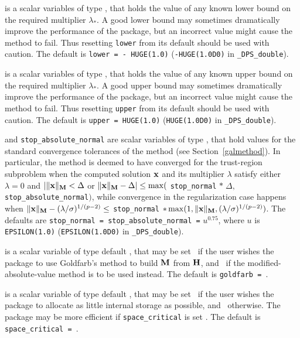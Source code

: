 \documentclass{galahad}
\newcommand{\packagename}{DPS}
\newcommand{\fullpackagename}{\libraryname\_\packagename}
\begin{document}
\begin{description}
 is a scalar variables of type \realdp, that holds the value
of any known lower bound on the required multiplier $\lambda_*$. A good lower
bound may sometimes dramatically improve the performance of the package, but
an incorrect value might cause the method to fail. Thus resetting
{\tt lower} from its default should be used with caution.
The default is {\tt lower = - HUGE(1.0)}
({\tt -HUGE(1.0D0)} in {\tt \fullpackagename\_double}).

 is a scalar variables of type \realdp, that holds the value
of any known upper bound on the required multiplier $\lambda_*$. A good upper
bound may sometimes dramatically improve the performance of the package, but
an incorrect value might cause the method to fail. Thus resetting
{\tt upper} from its default should be used with caution.
The default is {\tt upper = HUGE(1.0)}
({\tt HUGE(1.0D0)} in {\tt \fullpackagename\_double}).

 and {\tt stop\_absolute\_normal}
are scalar variables of type \realdp,
that hold values for the standard convergence tolerances of the method
(see Section~\ref{galmethod}).
In particular, the method is deemed to have converged for the trust-region
subproblem when the
computed solution ${\mathbf{x}}$ and its multiplier $\lambda$ satisfy either
$\lambda = 0$ and $|\|{\mathbf{x}}\|_{{\mathbf{M}}} < \Delta$ or
$\|{\mathbf{x}}\|_{{\mathbf{M}}} -  \Delta| \leq \max($ {\tt stop\_normal} $\ast \; \Delta,$
{\tt stop\_absolute\_normal}$)$,
while convergence in the regularization case happens when
$\|{\mathbf{x}}\|_{{\mathbf{M}}} -  (\lambda/\sigma)^{1/(p-2)} \leq$ {\tt stop\_normal}
\linebreak $\ast \max(1,\|{\mathbf{x}}\|_{{\mathbf{M}}},(\lambda/\sigma)^{1/(p-2)})$.
The defaults are {\tt stop\_normal = \tt stop\_absolute\_normal =}
$u^{0.75}$,
where $u$ is {\tt EPSILON(1.0)} ({\tt EPSILON(1.0D0)} in
{\tt \fullpackagename\_double}).

 is a scalar variable of type default \logical, that
may be set \true\ if the user wishes the package to use Goldfarb's
method to build ${\mathbf{M}}$ from ${\mathbf{H}}$, and \false\ if the modified-absolute-value
method is to be used instead.
The default is {\tt goldfarb = \false}.

 is a scalar variable of type default \logical, that
may be set \true\ if the user wishes the package to allocate as little
internal storage as possible, and \false\ otherwise. The package may
be more efficient if {\tt space\_critical} is set \false.
The default is {\tt space\_critical = \false}.


\end{description}
\end{document}
